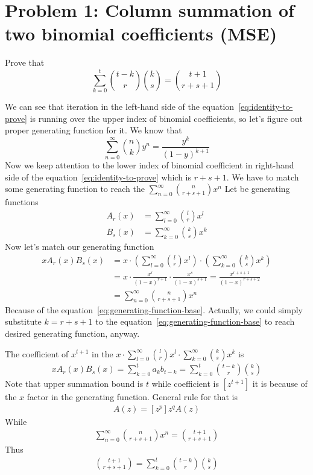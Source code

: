 ﻿\section{Problem 1: Column summation of two binomial coefficients (MSE)}
\label{sec:problem-1-column-summation-of-two-binomial-coefficients-mse}
Prove that
\begin{equation}
    \sum_{k=0}^{t} \binom{t-k}{r} \binom{k}{s} = \binom{t+1}{r+s+1}\label{eq:identity-to-prove}
\end{equation}

We can see that iteration in the left-hand side of the equation~\eqref{eq:identity-to-prove} is running
over the upper index of binomial coefficients, so let's figure out proper generating function for it.
We know that
\begin{equation}
    \sum_{n=0}^{\infty} \binom{n}{k} y^n = \frac{y^k}{(1-y)^{k+1}}\label{eq:generating-function-base}
\end{equation}
Now we keep attention to the lower index of binomial coefficient in right-hand side
of the equation~\eqref{eq:identity-to-prove} which is $r+s+1$.
We have to match some generating function to reach the $\sum_{n=0}^{\infty} \binom{n}{r+s+1} x^n$
Let be generating functions
\begin{align*}
    A_r(x) &= \sum_{l=0}^{\infty} \binom{l}{r} x^l\\
    B_s(x) &= \sum_{k=0}^{\infty} \binom{k}{s} x^k
\end{align*}
Now let's match our generating function
\begin{align*}
    x A_r(x) B_s(x)
    &= x \cdot \left( \sum_{l=0}^{\infty} \binom{l}{r} x^l \right) \cdot \left( \sum_{k=0}^{\infty} \binom{k}{s} x^k \right) \\
    &= x \cdot \frac{x^r}{(1-x)^{r+1}} \cdot \frac{x^s}{(1-x)^{s+1}} = \frac{x^{r+s+1}}{(1-x)^{r+s+2}} \\
    &= \sum_{n=0}^{\infty} \binom{n}{r+s+1} x^n
\end{align*}
Because of the equation~\eqref{eq:generating-function-base}.
Actually, we could simply substitute $k=r+s+1$ to the equation~\eqref{eq:generating-function-base} to reach desired
generating function, anyway.

The coefficient of $x^{t+1}$ in the $x \cdot \sum_{l=0}^{\infty} \binom{l}{r} x^l \cdot \sum_{k=0}^{\infty} \binom{k}{s} x^k$ is
\begin{align*}
[x^{t+1}]
    x A_r(x) B_s(x) = \sum_{k=0}^{t} a_k b_{t-k} = \sum_{k=0}^{t} \binom{t-k}{r} \binom{k}{s}
\end{align*}
Note that upper summation bound is $t$ while coefficient is $[z^{t+1}]$ it is because of the $x$ factor in the generating function.
General rule for that is
\begin{align*}
[z^{p-q}]
    A(z)=[z^p]z^qA(z)
\end{align*}
While
\begin{align*}
[x^{t+1}]
    \sum_{n=0}^{\infty} \binom{n}{r+s+1} x^n = \binom{t+1}{r+s+1}
\end{align*}
Thus
\begin{align*}
    \binom{t+1}{r+s+1} = \sum_{k=0}^{t} \binom{t-k}{r} \binom{k}{s}
\end{align*}

